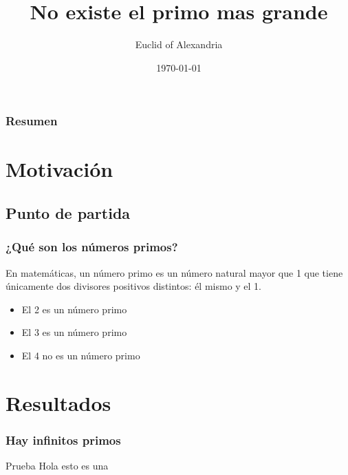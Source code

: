 \documentclass{beamer}
\title{No existe el primo mas grande}
\author{Euclid of Alexandria}
\date{\today}
\begin{document}
\begin{frame}
	\titlepage
\end{frame}

\begin{frame}
	\frametitle{Resumen}
	\tableofcontents
\end{frame}

\section{Motivación}
\subsection{Punto de partida}
\begin{frame} 
	\frametitle{¿Qué son los números primos?}
	\begin{definition}
		En matemáticas, un \alert{número primo} es un número natural mayor que 1 que tiene
		únicamente dos divisores positivos distintos: él mismo y el 1.
	\end{definition}
	\begin{example}
		\begin{itemize}
			\item El 2 es un número primo \pause
			\item El 3 es un número primo \pause
			\item El 4 no es un número primo 
		\end{itemize}
	\end{example}
\end{frame}

\section{Resultados}
\begin{frame} \frametitle{Hay infinitos primos}
	\begin{block}{Prueba}
		Hola esto es una 
	\end{block} 
\end{frame}
\end{document}
